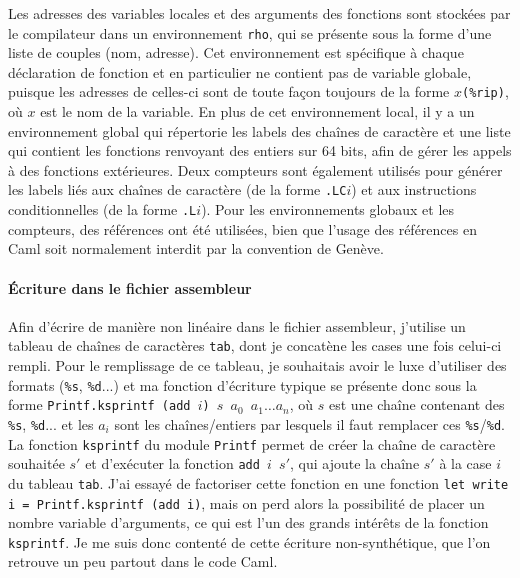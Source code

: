 \documentclass[10pt,a4paper]{article}
\begin{document}
Les adresses des variables locales et des arguments des fonctions sont stockées par le compilateur dans un environnement \texttt{rho}, qui se présente sous la forme d'une liste de couples (nom, adresse). Cet environnement est spécifique à chaque déclaration de fonction et en particulier ne contient pas de variable globale, puisque les adresses de celles-ci sont de toute façon toujours de la forme \texttt{$x$(\%rip)}, où $x$ est le nom de la variable. En plus de cet environnement local, il y a un environnement global qui répertorie les labels des chaînes de caractère et une liste qui contient les fonctions renvoyant des entiers sur 64 bits, afin de gérer les appels à des fonctions extérieures. Deux compteurs sont également utilisés pour générer les labels liés aux chaînes de caractère (de la forme \texttt{.LC$i$}) et aux instructions conditionnelles (de la forme \texttt{.L$i$}). Pour les environnements globaux et les compteurs, des références ont été utilisées, bien que l'usage des références en Caml soit normalement interdit par la convention de Genève.

\paragraph{Écriture dans le fichier assembleur}

Afin d'écrire de manière non linéaire dans le fichier assembleur, j'utilise un tableau de chaînes de caractères \texttt{tab}, dont je concatène les cases une fois celui-ci rempli. Pour le remplissage de ce tableau, je souhaitais avoir le luxe d'utiliser des formats (\texttt{\%s}, \texttt{\%d}...) et ma fonction d'écriture typique se présente donc sous la forme \texttt{Printf.ksprintf (add $i$) $s$ $a_0$ $a_1 \dots a_n$}, où $s$ est une chaîne contenant des \texttt{\%s}, \texttt{\%d}... et les $a_i$ sont les chaînes/entiers par lesquels il faut remplacer ces \texttt{\%s}/\texttt{\%d}. La fonction \texttt{ksprintf} du module \texttt{Printf} permet de créer la chaîne de caractère souhaitée $s'$ et d'exécuter la fonction \texttt{add $i$ $s'$}, qui ajoute la chaîne $s'$ à la case $i$ du tableau \texttt{tab}. J'ai essayé de factoriser cette fonction en une fonction \texttt{let write i = Printf.ksprintf (add i)}, mais on perd alors la possibilité de placer un nombre variable d'arguments, ce qui est l'un des grands intérêts de la fonction \texttt{ksprintf}. Je me suis donc contenté de cette écriture non-synthétique, que l'on retrouve un peu partout dans le code Caml.
\end{document}

